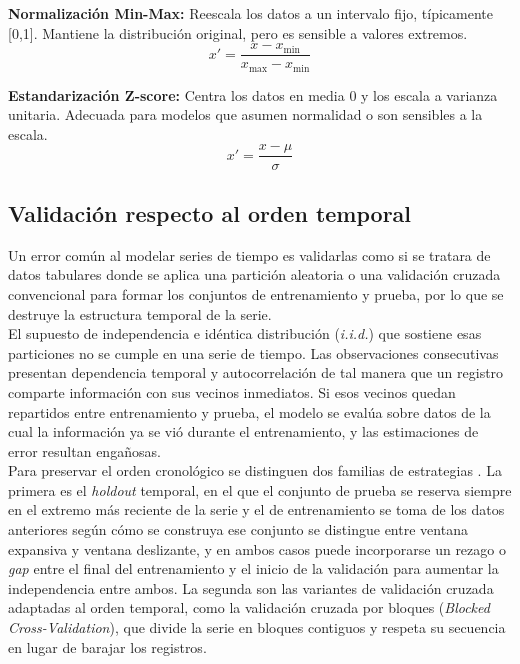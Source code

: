 \textbf{Normalización Min-Max:}
Reescala los datos a un intervalo fijo, típicamente [0,1].
Mantiene la distribución original, pero es sensible a valores extremos.\\[.15cm]
\[
x' = \frac{x - x_{\min}}{x_{\max} - x_{\min}}
\]

\textbf{Estandarización Z-score:}
Centra los datos en media 0 y los escala a varianza unitaria.
Adecuada para modelos que asumen normalidad o son sensibles a la escala.\\[.15cm]

\[
x' = \frac{x - \mu}{\sigma}
\]

\subsection{Validación respecto al orden temporal}

Un error común al modelar series de tiempo es validarlas como si se tratara de datos tabulares donde se aplica una partición aleatoria o una validación cruzada convencional para formar los conjuntos de entrenamiento y prueba, por lo que se destruye la estructura temporal de la serie.\\[.15cm]

El supuesto de independencia e idéntica distribución (\textit{i.i.d.}) que sostiene esas particiones no se cumple en una serie de tiempo. Las observaciones consecutivas presentan dependencia temporal y autocorrelación de tal manera que un registro comparte información con sus vecinos inmediatos. Si esos vecinos quedan repartidos entre entrenamiento y prueba, el modelo se evalúa sobre datos de la cual la información ya se vió durante el entrenamiento, y las estimaciones de error resultan engañosas.\\[.15cm]

Para preservar el orden cronológico se distinguen dos familias de estrategias \cite{joseph2022}. La primera es el \textit{holdout} temporal, en el que el conjunto de prueba se reserva siempre en el extremo más reciente de la serie y el de entrenamiento se toma de los datos anteriores según cómo se construya ese conjunto se distingue entre ventana expansiva y ventana deslizante, y en ambos casos puede incorporarse un rezago o \textit{gap} entre el final del entrenamiento y el inicio de la validación para aumentar la independencia entre ambos. La segunda son las variantes de validación cruzada adaptadas al orden temporal, como la validación cruzada por bloques (\textit{Blocked Cross-Validation}), que divide la serie en bloques contiguos y respeta su secuencia en lugar de barajar los registros.\\[.15cm]

